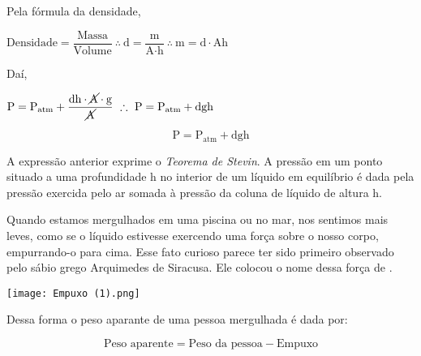 \documentclass[book, 12pt, twoside, a5paper, english, brazil, sumario=tradicional, openany]{abntex2}
\begin{document}
Pela fórmula da densidade, 

\begin{center}
    $\text{Densidade} =  \dfrac{\text{Massa}}{\text{Volume}} \ \therefore \ \text{d} = \dfrac{\text{m}}{\text{A} \cdot \text{h}} \ \therefore \ \text{m} = \text{d} \cdot \text{Ah}$
\end{center}

Daí, 

\begin{center}
    $\text{P} = \text{P}_{\text{atm}} + \dfrac{\text{dh} \cdot \cancel{\text{A}} \cdot  \text{g}}{\cancel{\text{A}}} \ \therefore \ \text{P} = \text{P}_{\text{atm}} + \text{dgh}$
\end{center}

\begin{equation}
    \text{P} = \text{P}_{\text{atm}} + \text{dgh}
\end{equation}

A expressão anterior exprime o \textit{Teorema de Stevin}. A pressão em um ponto situado a uma profundidade h no interior de um líquido em equilíbrio é dada pela pressão exercida pelo ar somada à pressão da coluna de líquido de altura h.

\vspace{-0.44cm}

{}

\vspace{-0.3cm}

Quando estamos mergulhados em uma piscina ou no mar, nos sentimos mais leves, como se o líquido estivesse exercendo uma força sobre o nosso corpo, empurrando-o para cima. Esse fato curioso parece ter sido primeiro observado pelo sábio grego Arquimedes de Siracusa. Ele colocou o nome dessa força de {\color{celestialblue}{Empuxo}}.

\vspace{0.5cm}
\begin{center}
    \texttt{[image: Empuxo (1).png]} 
\end{center}
\vspace{-0.23cm}

Dessa forma o peso aparante de uma pessoa mergulhada é dada por:

\vspace{-0.3cm}

\begin{equation}
    \text{Peso aparente} = \text{Peso da pessoa} - \text{Empuxo}
\end{equation}
\end{document}
